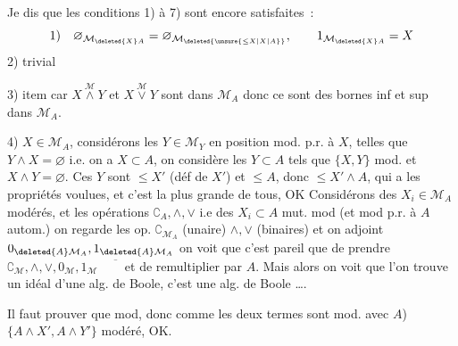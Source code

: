 Je dis que les conditions 1) à 7) sont encore satisfaites~:
\[
\text{1)}\quad\varnothing_{\mathcal M_{\deleted{X}A}}=\varnothing_{\mathcal M_{\deleted{\unsure{\leq X|X|A}}}},\qquad 1_{\mathcal M_{\deleted{X}A}}=X
\]
2)  trivial

3) item car  $X\overset{\mathcal M}{\wedge}Y$ et $X\overset{\mathcal M}{\vee}Y$ sont dans $\mathcal M_A$ donc ce sont des bornes inf et sup dans $\mathcal M_A$.

4)  $X\in \mathcal M_A$, considérons les $Y\in \mathcal M_{Y}$ en position mod. p.r. à $X$, telles que $Y\wedge X=\varnothing$ i.e.  on a $X\subset A$, on considère les $Y\subset A$ tels que $\{X,Y\}$ mod. et $X\wedge Y=\varnothing$. Ces $Y$ sont $\leq X'$ (déf de $X'$) et $\leq A$, donc $\leq X'\wedge A$, qui a les propriétés voulues, et c'est la plus grande de tous, OK
Considérons des $X_i\in \mathcal M_A$  modérés, et les opérations $\complement_A,\wedge,\vee$  i.e des $X_i\subset A$ mut. mod (et mod p.r. à $A$ autom.) on regarde les op.
  $\complement_{\mathcal M_A}$ (unaire) $\wedge,\vee$ (binaires) et on adjoint $0_{\deleted{A}\mathcal M_A},1_{\deleted{A}\mathcal M_A}$\unsure{)|,} on voit que c'est pareil que
 de prendre $\complement_{\mathcal M},\wedge,\vee,0_{\mathcal M},1_{\mathcal M}\quad\overline{\phantom X}$ et de remultiplier par $A$. Mais
alors on voit que l'on trouve un idéal d'une alg. de Boole, c'est une alg. de Boole \ldots.

 Il faut prouver que
mod, donc comme  les deux termes sont mod. avec $A$) $\{A\wedge X',A\wedge Y'\}$ modéré, OK.

